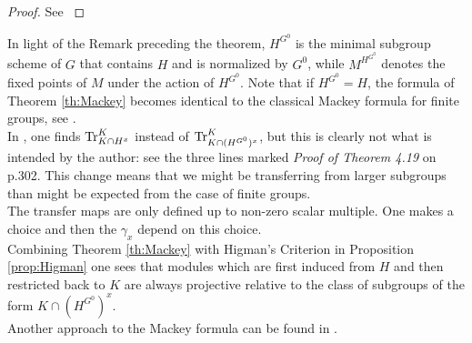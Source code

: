 \documentclass[12pt]{amsart}
\theoremstyle{definition}
\begin{document}
\begin{proof}
	See \cite[4.18 \& 4.19]{MR1375579}
\end{proof}


 In light of the Remark preceding the theorem, $H^{G^0}$ is the minimal subgroup scheme of $G$ that contains $H$ and is normalized by $G^0$, while $M^{H^{G^0}}$ denotes the fixed points of $M$ under the action of $H^{G^0}$. Note that if $H^{G^0}=H$, the formula of Theorem \ref{th:Mackey} becomes identical to the classical Mackey formula for finite groups, see \cite[3.6.11]{benson}. \\

 In \cite[4.18]{MR1375579}, one finds  ${\rm Tr}_{K\cap H^x}^K $ instead of ${\rm Tr}_{K\cap (H^{G^0})^x}^K$, but this is clearly not what is intended by the author: see the three lines marked {\em Proof of Theorem 4.19} on p.302. This change means that we might be transferring from larger subgroups than might be expected from the case of finite groups.\\

 The transfer maps are only defined up to non-zero scalar multiple. One makes a choice and then the $\gamma_x$ depend on this choice.\\

 Combining Theorem \ref{th:Mackey} with Higman's Criterion in Proposition \ref{prop:Higman} one sees that modules which are first induced from $H$ and then restricted back to $K$ are always projective relative to the class of subgroups of the form $K\cap (H^{G^0})^x$.\\

 Another approach to the Mackey formula can be found in \cite[\S 8]{MR486168}.
\end{document}
